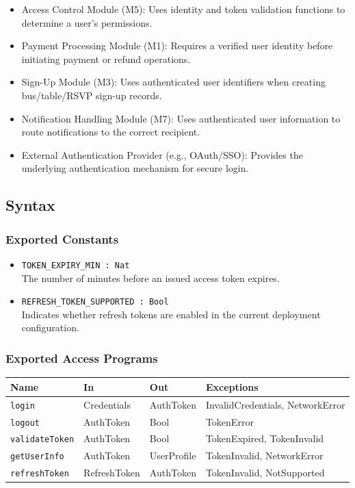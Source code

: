 \documentclass[12pt, titlepage]{article}
\begin{document}
\begin{itemize}
    \item Access Control Module (M5): Uses identity and token validation functions to determine a user's permissions.
    \item Payment Processing Module (M1): Requires a verified user identity before initiating payment or refund operations.
    \item Sign-Up Module (M3): Uses authenticated user identifiers when creating bus/table/RSVP sign-up records.
    \item Notification Handling Module (M7): Uses authenticated user information to route notifications to the correct recipient.
    \item External Authentication Provider (e.g., OAuth/SSO): Provides the 
    underlying authentication mechanism for secure login.
\end{itemize}

\subsection{Syntax}

\subsubsection{Exported Constants}

\begin{itemize}
    \item \texttt{TOKEN\_EXPIRY\_MIN : Nat}\\
    The number of minutes before an issued access token expires.
    \item \texttt{REFRESH\_TOKEN\_SUPPORTED : Bool}\\
    Indicates whether refresh tokens are enabled in the current 
    deployment configuration.
\end{itemize}

\subsubsection{Exported Access Programs}

\begin{center}
\renewcommand{\arraystretch}{1.2}
\begin{tabularx}{\textwidth}{l l l X}
\toprule
\textbf{Name} & \textbf{In} & \textbf{Out} & \textbf{Exceptions} \\
\midrule
\texttt{login} & Credentials & AuthToken & InvalidCredentials, NetworkError \\
\texttt{logout} & AuthToken & Bool & TokenError \\
\texttt{validateToken} & AuthToken & Bool & TokenExpired, TokenInvalid \\
\texttt{getUserInfo} & AuthToken & UserProfile & TokenInvalid, NetworkError \\
\texttt{refreshToken} & RefreshToken & AuthToken & TokenInvalid, NotSupported \\
\bottomrule
\end{tabularx}
\end{center}
\end{document}
